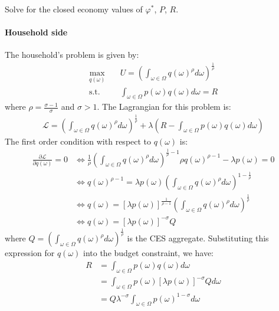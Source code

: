 Solve for the closed economy values of $\varphi^*$, $P$, $R$.

\begin{solution}
    \paragraph{Household side} The household's problem is given by:
    \begin{align*}
        \max_{q(\omega)} \quad & U = \left( \int_{\omega \in \Omega} q(\omega)^{\rho} d\omega \right)^{\frac{1}{\rho}} \\
        \text{s.t.} \quad & \int_{\omega \in \Omega} p(\omega) q(\omega) d\omega = R
    \end{align*}
    where $\rho = \frac{\sigma - 1}{\sigma}$ and $\sigma > 1$. The Lagrangian for this problem is:
    \begin{align*}
        \mathcal{L} = \left( \int_{\omega \in \Omega} q(\omega)^{\rho} d\omega \right)^{\frac{1}{\rho}} + \lambda \left( R - \int_{\omega \in \Omega} p(\omega) q(\omega) d\omega \right)
    \end{align*}
    The first order condition with respect to $q(\omega)$ is:
    \begin{align*}
        \frac{\partial \mathcal{L}}{\partial q(\omega)} = 0 &\iff \frac{1}{\rho} \left( \int_{\omega \in \Omega} q(\omega)^{\rho} d\omega \right)^{\frac{1}{\rho} - 1} \rho q(\omega)^{\rho - 1} - \lambda p(\omega) = 0 \\
        &\iff q(\omega)^{\rho - 1} = \lambda p(\omega) \left( \int_{\omega \in \Omega} q(\omega)^{\rho} d\omega \right)^{1 - \frac{1}{\rho}} \\
        &\iff q(\omega) = \left[ \lambda p(\omega) \right]^{\frac{1}{\rho - 1}} \left( \int_{\omega \in \Omega} q(\omega)^{\rho} d\omega \right)^{\frac{1}{\rho} } \\
        &\iff q(\omega) = \left[ \lambda p(\omega) \right]^{-\sigma} Q 
    \end{align*}
    where $Q = \left( \int_{\omega \in \Omega} q(\omega)^{\rho} d\omega \right)^{\frac{1}{\rho}}$ is the CES aggregate. Substituting this expression for $q(\omega)$ into the budget constraint, we have:
    \begin{align*}
        R &= \int_{\omega \in \Omega} p(\omega) q(\omega) d\omega \\
        &= \int_{\omega \in \Omega} p(\omega) \left[ \lambda p(\omega) \right]^{-\sigma} Q d\omega \\
        &= Q \lambda^{-\sigma} \int_{\omega \in \Omega} p(\omega)^{1 - \sigma} d\omega \\

\end{align*}
\end{solution}
